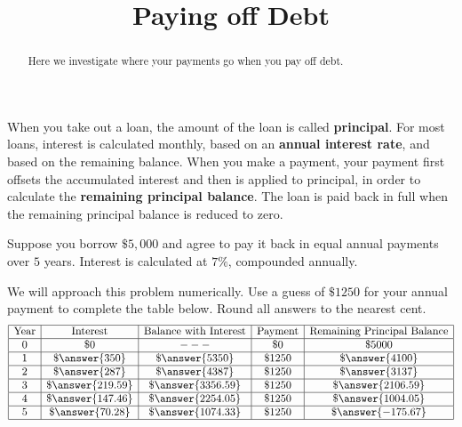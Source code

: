 \documentclass{ximera}
\title{Paying off Debt}
\begin{document}
\begin{abstract}
Here we investigate where your payments go when you pay off debt.
\end{abstract}
\maketitle

When you take out a loan, the amount of the loan is called
\textbf{principal}.  For most loans, interest is calculated monthly,
based on an \textbf{annual interest rate}, and based on the remaining
balance.  When you make a payment, your payment first offsets the
accumulated interest and then is applied to principal, in order to
calculate the \textbf{remaining principal balance}.  The loan is paid
back in full when the remaining principal balance is reduced to zero.

\begin{question}%
Suppose you borrow $\$5,000$ and agree to pay it back in equal annual
payments over $5$ years.  Interest is calculated at $7\%$,
compounded annually. 


We will approach this problem numerically.  Use a guess of $\$1250$
for your annual payment to complete the table below. Round
all answers to the nearest cent.
\[
  \begin{array}{|c|c|c|c|c|}
    \hline
    \text{Year} & \text{Interest}             & \text{Balance with Interest} & \text{Payment}    & \text{Remaining Principal Balance}\\ \hline
    0  & \$ 0               & ---                   & \$ 0     & \$ 5000 \\ \hline
    1  & \$ \answer{350}    & \$ \answer{5350}    & \$ 1250  & \$ \answer{4100} \\ \hline
    2  & \$ \answer{287}    & \$ \answer{4387}    & \$ 1250  & \$ \answer{3137} \\ \hline
    3  & \$ \answer{219.59} & \$ \answer{3356.59} & \$ 1250  & \$ \answer{2106.59} \\ \hline
    4  & \$ \answer{147.46} & \$ \answer{2254.05} & \$ 1250  & \$ \answer{1004.05} \\ \hline
    5  & \$ \answer{70.28}  & \$ \answer{1074.33} & \$ 1250  & \$ \answer{-175.67} \\ \hline
  \end{array}
\]

\end{question}
\end{document}
